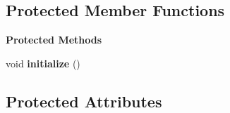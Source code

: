 \subsection*{Protected Member Functions}
\begin{Indent}\textbf{ Protected Methods}\par
\begin{DoxyCompactItemize}
\item 
\mbox{\label{classrev_1_1_process_thread_a25f7dae242392b099a66ada5f4e98d6f}} 
void {\bfseries initialize} ()
\end{DoxyCompactItemize}
\end{Indent}
\subsection*{Protected Attributes}
